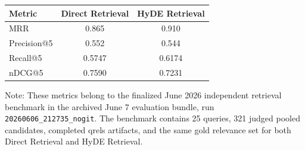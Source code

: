 \begin{tabular}{lcc}
\toprule
Metric & Direct Retrieval & HyDE Retrieval \\
\midrule
MRR & 0.865 & 0.910 \\
Precision@5 & 0.552 & 0.544 \\
Recall@5 & 0.5747 & 0.6174 \\
nDCG@5 & 0.7590 & 0.7231 \\
\bottomrule
\end{tabular}

\vspace{2pt}
\parbox{0.95\linewidth}{\footnotesize Note: These metrics belong to the finalized June 2026 independent retrieval benchmark in the archived June 7 evaluation bundle, run \texttt{20260606\_212735\_nogit}. The benchmark contains 25 queries, 321 judged pooled candidates, completed qrels artifacts, and the same gold relevance set for both Direct Retrieval and HyDE Retrieval.}
